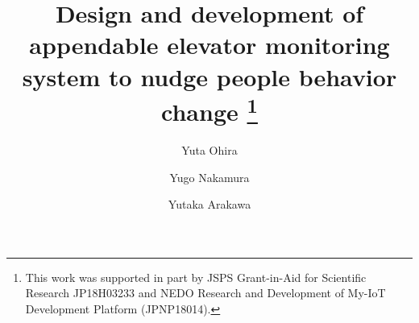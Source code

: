 \documentclass[runningheads]{llncs}
\begin{document}
\title{
  Design and development of appendable elevator monitoring system to nudge people behavior change
  \thanks{This work was supported in part by JSPS Grant-in-Aid for Scientific Research JP18H03233 and NEDO Research and Development of My-IoT Development Platform (JPNP18014).}
}

\author{
  Yuta Ohira \and
  Yugo Nakamura \and
  Yutaka Arakawa
}



\maketitle








%
%
%
% 
% 
%
\end{document}
